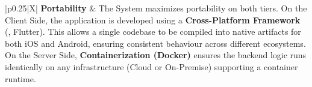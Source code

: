 \begin{table}[H]
\begin{xltabular}{\textwidth}{|p{0.25\textwidth}|X|}
    \textbf{Portability} & 
    The System maximizes portability on both tiers. On the Client Side, the application is developed using a \textbf{Cross-Platform Framework} (\eg, Flutter). This allows a single codebase to be compiled into native artifacts for both iOS and Android, ensuring consistent behaviour across different ecosystems. On the Server Side, \textbf{Containerization (Docker)} ensures the backend logic runs identically on any infrastructure (Cloud or On-Premise) supporting a container runtime. \\
    \hline
\end{xltabular}
\caption{Software System Attributes}
\end{table}
